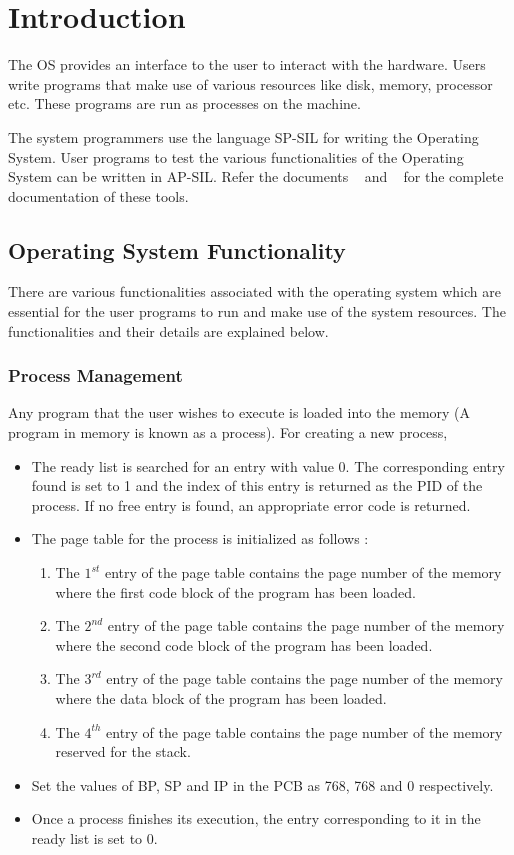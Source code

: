 \chapter{Introduction}
\label{chp:osintro}
The OS provides an interface to the user to interact with the hardware. Users write programs that make use of various resources like disk, memory, processor etc. These programs are run as processes on the machine.

The system programmers use the language SP-SIL for writing the Operating System. User programs to test the various functionalities of the Operating System can be written in AP-SIL. Refer the documents ~\cite{spsil} and ~\cite{apsil} for the complete documentation of these tools.

\section{Operating System Functionality}
There are various functionalities associated with the operating system which are essential for the user programs to run and make use of the system resources. The functionalities and their details are explained below.

\subsection{Process Management}
Any program that the user wishes to execute is loaded into the memory (A program in memory is known as a process). For creating a new process,

\begin{itemize}
	\item The ready list is searched for an entry with value 0. The corresponding entry found is set to 1 and the index of this entry is returned as the PID of the process. If no free entry is found, an appropriate error code is returned.
	\item The page table for the process is initialized as follows :
	\begin{enumerate}
		\item The $1^{st}$ entry of the page table contains the page number of the memory where the first code block of the program has been loaded.
		\item The $2^{nd}$ entry of the page table contains the page number of the memory where the second code block of the program has been loaded.
		\item The $3^{rd}$ entry of the page table contains the page number of the memory where the data block of the program has been loaded.
		\item The $4^{th}$ entry of the page table contains the page number of the memory reserved for the stack.
	\end{enumerate}
	\item Set the values of BP, SP and IP in the PCB as 768, 768 and 0 respectively.
	\item Once a process finishes its execution, the entry corresponding to it in the ready list is set to 0.
\end{itemize}

